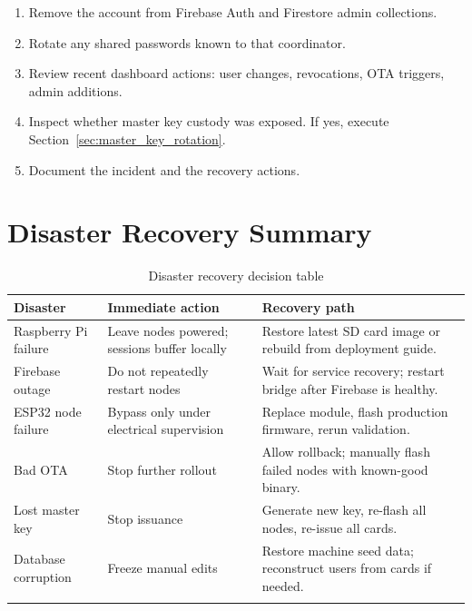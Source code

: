 \begin{enumerate}[leftmargin=1.5em]
    \item Remove the account from Firebase Auth and Firestore admin collections.
    \item Rotate any shared passwords known to that coordinator.
    \item Review recent dashboard actions: user changes, revocations, OTA triggers, admin additions.
    \item Inspect whether master key custody was exposed. If yes, execute Section~\ref{sec:master_key_rotation}.
    \item Document the incident and the recovery actions.
\end{enumerate}

\section{Disaster Recovery Summary}

\begin{longtable}{L{3.5cm}L{5cm}L{5.5cm}}
\toprule
\textbf{Disaster} & \textbf{Immediate action} & \textbf{Recovery path} \\
\midrule
\endhead
Raspberry Pi failure & Leave nodes powered; sessions buffer locally & Restore latest SD card image or rebuild from deployment guide. \\
Firebase outage & Do not repeatedly restart nodes & Wait for service recovery; restart bridge after Firebase is healthy. \\
ESP32 node failure & Bypass only under electrical supervision & Replace module, flash production firmware, rerun validation. \\
Bad OTA & Stop further rollout & Allow rollback; manually flash failed nodes with known-good binary. \\
Lost master key & Stop issuance & Generate new key, re-flash all nodes, re-issue all cards. \\
Database corruption & Freeze manual edits & Restore machine seed data; reconstruct users from cards if needed. \\
\bottomrule
\caption{Disaster recovery decision table}
\label{tab:dr_summary}
\end{longtable}
